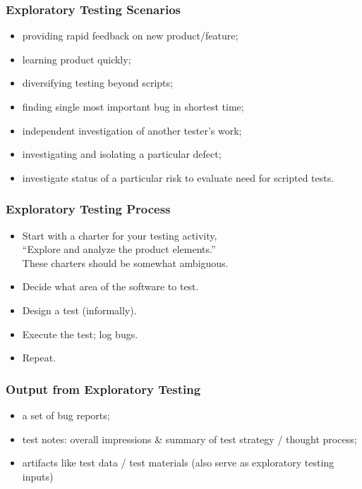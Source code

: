 \documentclass{beamer}
\newenvironment{changemargin}[1]{%
  \begin{list}{}{%
    \setlength{\topsep}{0pt}%
    \setlength{\leftmargin}{#1}%
    \setlength{\rightmargin}{1em}
    \setlength{\listparindent}{\parindent}%
    \setlength{\itemindent}{\parindent}%
    \setlength{\parsep}{\parskip}%
  }%
  \item[]}{\end{list}}
\begin{document}
\begin{frame}
  \frametitle{Exploratory Testing Scenarios}
  \begin{changemargin}{2em}
    \begin{itemize}
      \item providing rapid feedback on new product/feature;
\item learning product quickly;
\item diversifying testing beyond scripts;
\item finding single most important bug in shortest time;
\item independent investigation of another tester's work;
\item investigating and isolating a particular defect;
\item investigate status of a particular risk to evaluate need for scripted tests.
    \end{itemize}
  \end{changemargin}
\end{frame}

\begin{frame}
  \frametitle{Exploratory Testing Process}
  \begin{changemargin}{2em}
    \begin{itemize}
    \item Start with a charter for your testing activity,\\
      \qquad ``Explore and analyze the product elements.'' \\
      \qquad These charters should be somewhat ambiguous.
\item Decide what area of the software to test.
\item Design a test (informally).
\item Execute the test; log bugs.
\item Repeat.
    \end{itemize}
  \end{changemargin}
\end{frame}

\begin{frame}
  \frametitle{Output from Exploratory Testing}
  \begin{changemargin}{2em}
    \Large
    \begin{itemize}
    \item a set of bug reports;
    \item test notes: overall impressions \& summary of test strategy / thought process;
    \item artifacts like test data / test materials (also serve as exploratory testing inputs)
    \end{itemize}
  \end{changemargin}
\end{frame}
\end{document}
